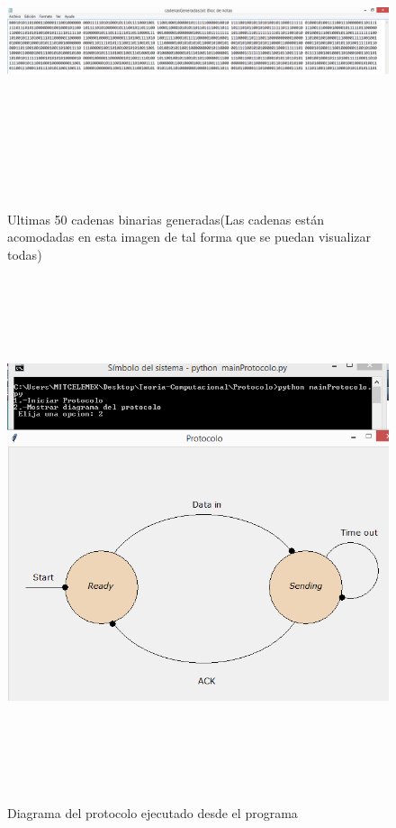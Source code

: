 \documentclass[12pt,letterpaper]{article}
\begin{document}
\begin{figure}[H]
\includegraphics[width=\textwidth, height=9cm]{textoProtocoloGen.png}
\label{fig:protocoloTextoG}
\caption{Ultimas 50 cadenas binarias generadas(Las cadenas est\'an acomodadas en esta imagen de tal forma que se puedan visualizar todas)}
\end{figure}


\begin{figure}[H]
\includegraphics[width=\textwidth, height=15cm]{DiaProtocolo.png}
\label{fig:protocoloDiag}
\caption{Diagrama del protocolo ejecutado desde el programa}
\end{figure}
\newpage
\end{document}
